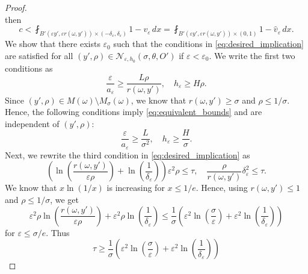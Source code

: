 \documentclass[10pt,a4paper]{amsart}
\begin{document}
\begin{proof}
\begin{equation}
    \end{equation}
    then
    \begin{equation}
        c < \fint_{B'(\varepsilon y', \varepsilon r(\omega, y')) \times (-\delta_\varepsilon, \delta_\varepsilon)} 1 - v_\varepsilon \, dx = \fint_{B'(\varepsilon y', \varepsilon r(\omega, y')) \times (0, 1)} 1 - \hat{v}_\varepsilon \, dx.
    \end{equation}
    We show that there exists $\varepsilon_0$ such that the conditions in \eqref{eq:desired_implication} are satisfied for all $(y', \rho) \in \mathcal{N}_{\varepsilon, h_0}(\sigma, \theta, O')$ if $\varepsilon < \varepsilon_0$. We write the first two conditions as
    \begin{equation} \label{eq:equivalent_bounds}
        \frac{\varepsilon}{a_\varepsilon} \ge \frac{L \rho}{r(\omega, y')}, \quad h_\varepsilon \ge H \rho.
    \end{equation}
    Since $(y', \rho) \in M(\omega) \setminus M_\sigma(\omega)$, we know that $r(\omega, y') \ge \sigma$ and $\rho \le 1/\sigma$. Hence, the following conditions imply \eqref{eq:equivalent_bounds} and are independent of $(y', \rho)$:
    \begin{equation} \label{eq:equivalent_bounds_independent}
        \frac{\varepsilon}{a_\varepsilon} \ge \frac{L}{\sigma^2}, \quad h_\varepsilon \ge \frac{H}{\sigma}.
    \end{equation}
    Next, we rewrite the third condition in \eqref{eq:desired_implication} as
    \begin{equation} \label{eq:equivalent_bounds_2}
        \left(\ln\left(\frac{r(\omega, y')}{\varepsilon \rho}\right) + \ln\left(\frac{1}{\delta_\varepsilon}\right) \right) \varepsilon^2 \rho \le \tau, \quad \frac{\rho}{r(\omega, y')} \delta_\varepsilon^2 \le \tau.
    \end{equation}
    We know that $x \ln(1/x)$ is increasing for $x \le 1/e$. Hence, using $r(\omega, y') \le 1$ and $\rho \le 1/\sigma$, we get
    \[
    \varepsilon^2 \rho \ln\left(\frac{r(\omega, y')}{\varepsilon \rho}\right) + \varepsilon^2 \rho \ln\left(\frac{1}{\delta_\varepsilon}\right) \le \frac{1}{\sigma} \left(\varepsilon^2 \ln\left(\frac{\sigma}{\varepsilon}\right) + \varepsilon^2 \ln\left(\frac{1}{\delta_\varepsilon}\right)\right)
    \]
    for $\varepsilon \le \sigma/e$. Thus
    \begin{equation} \label{eq:equivalent_bounds_independent_2}
        \tau \ge \frac{1}{\sigma} \left(\varepsilon^2 \ln\left(\frac{\sigma}{\varepsilon}\right) + \varepsilon^2 \ln\left(\frac{1}{\delta_\varepsilon}\right)\right)

\end{equation}
\end{proof}
\end{document}
